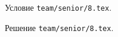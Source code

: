 \problem{}
Условие \texttt{team/senior/8.tex}.

\solution Решение \texttt{team/senior/8.tex}.
\endproblem
